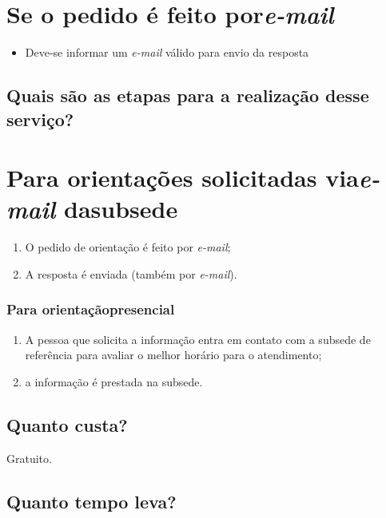 \chapter{\texorpdfstring{Se o pedido é feito por\emph{e-mail}}{Se o pedido é feito por e-mail}}

\begin{itemize}
  \item  Deve-se informar um \emph{e-mail} válido para envio da resposta
\end{itemize}

\section{Quais são as etapas para a realização desse serviço?}

\chapter{\texorpdfstring{Para orientações solicitadas via\emph{e-mail} dasubsede}{Para orientações solicitadas via e-mail da subsede}}

\begin{enumerate}
  \item  O pedido de orientação é feito por \emph{e-mail};
  \item  A resposta é enviada (também por \emph{e-mail}).
\end{enumerate}

\subsection{Para orientaçãopresencial}

\begin{enumerate}
  \item  A pessoa que solicita a informação entra em contato com a subsede de  referência para avaliar o melhor horário para o atendimento;
  \item  a informação é prestada na subsede.
\end{enumerate}

\section{Quanto custa?}

Gratuito.

\section{Quanto tempo leva?}

